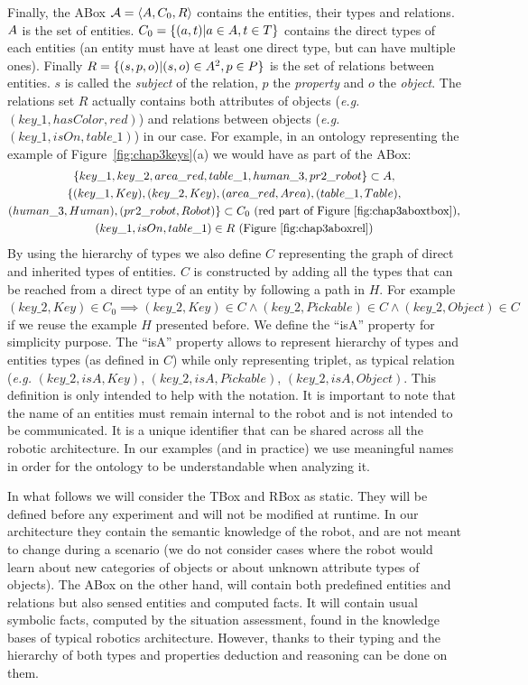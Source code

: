 \documentclass[a4paper,11pt,twoside]{StyleThese}
\begin{document}
Finally, the ABox $\mathcal{A} = \langle A, C_0, R \rangle$ contains the entities, their types and relations. $A$ is the set of entities. $C_0 = \{(a, t)|a \in A, t \in T\}$ contains the direct types of each entities (an entity must have at least one direct type, but can have multiple ones). Finally $R = \{(s, p, o)|(s, o) \in A^2, p \in P\}$ is the set of relations between entities. $s$ is called the \textit{subject} of the relation, $p$ the \textit{property} and $o$ the \textit{object}. The relations set $R$ actually contains both attributes of objects (\textit{e.g.} $(key\_1, hasColor, red)$) and relations between objects (\textit{e.g.} $(key\_1, isOn, table\_1)$) in our case. For example, in an ontology representing the example of Figure~\ref{fig:chap3keys}(a) we would have as part of the ABox: 
\begin{multline*}
\{key\_1, key\_2, area\_red, table\_1, human\_3, pr2\_robot\} \subset A,\\
\{(key\_1, Key), (key\_2, Key), (area\_red, Area), (table\_1, Table),\\
(human\_3, Human), (pr2\_robot, Robot)\} \subset C_0 \text{ (red part of Figure~\ref{fig:chap3aboxtbox})},\\
(key\_1, isOn, table\_1) \in R \text{ (Figure~\ref{fig:chap3aboxrel})}
\end{multline*}
By using the hierarchy of types we also define $C$ representing the graph of direct and inherited types of entities. $C$ is constructed by adding all the types that can be reached from a direct type of an entity by following a path in $H$. For example $(key\_2, Key) \in C_0 \implies (key\_2, Key) \in C \land (key\_2, Pickable) \in C \land (key\_2, Object) \in C$ if we reuse the example $H$ presented before.
We define the ``isA'' property for simplicity purpose. The ``isA'' property allows to represent hierarchy of types and entities types (as defined in $C$) while only representing triplet, as typical relation (\textit{e.g.} $(key\_2, isA, Key)$, $(key\_2, isA, Pickable)$, $(key\_2, isA, Object)$. This definition is only intended to help with the notation.
It is important to note that the name of an entities must remain internal to the robot and is not intended to be communicated. It is a unique identifier that can be shared across all the robotic architecture. In our examples (and in practice) we use meaningful names in order for the ontology to be understandable when analyzing it.

In what follows we will consider the TBox and RBox as static. They will be defined before any experiment and will not be modified at runtime. In our architecture they contain the semantic knowledge of the robot, and are not meant to change during a scenario (we do not consider cases where the robot would learn about new categories of objects or about unknown attribute types of objects). The ABox on the other hand, will contain both predefined entities and relations but also sensed entities and computed facts. It will contain usual symbolic facts, computed by the situation assessment, found in the knowledge bases of typical robotics architecture. However, thanks to their typing and the hierarchy of both types and properties deduction and reasoning can be done on them.
\end{document}
